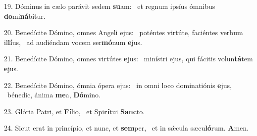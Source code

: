19. Dóminus in cælo parávit sedem \textbf{su}am: \ast\  et regnum ipsíus ómnibus \textbf{do}mi\textbf{ná}bitur.\

20. Benedícite Dómino, omnes Angeli ejus: \dag\  poténtes virtúte, faciéntes verbum il\textbf{lí}us, \ast\  ad audiéndam vocem ser\textbf{mó}num \textbf{e}jus.\

21. Benedícite Dómino, omnes virtútes \textbf{e}jus: \ast\  minístri ejus, qui fácitis volun\textbf{tá}tem \textbf{e}jus.\

22. Benedícite Dómino, ómnia ópera ejus: \dag\  in omni loco dominatiónis \textbf{e}jus, \ast\  bénedic, ánima \textbf{me}a, \textbf{Dó}mino.\

23. Glória Patri, et \textbf{Fí}lio, \ast\  et Spi\textbf{rí}tui \textbf{Sanc}to.\

24. Sicut erat in princípio, et nunc, et \textbf{sem}per, \ast\  et in sǽcula sæcu\textbf{ló}rum. \textbf{A}men.\

